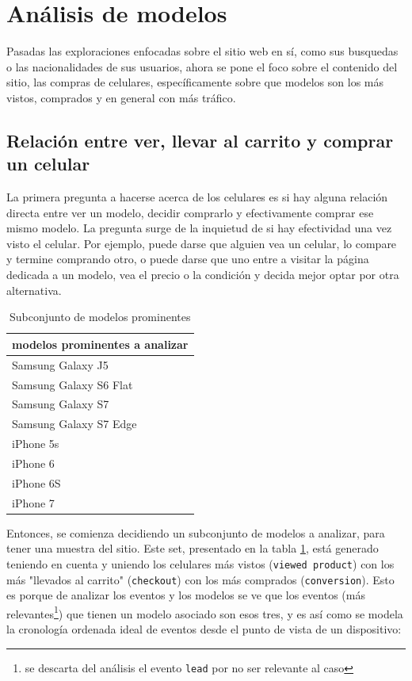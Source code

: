 \documentclass[a4paper]{article}
\begin{document}
\section{Análisis de modelos} \label{modelo}

Pasadas las exploraciones enfocadas sobre el sitio web en sí, como sus busquedas o las nacionalidades de sus usuarios, ahora se pone el foco sobre el contenido del sitio, las compras de celulares, específicamente sobre que modelos son los más vistos, comprados y en general con más tráfico.

\subsection{Relación entre ver, llevar al carrito y comprar un celular}

La primera pregunta a hacerse acerca de los celulares es si hay alguna relación directa entre ver un modelo, decidir comprarlo y efectivamente comprar ese mismo modelo. La pregunta surge de la inquietud de si hay efectividad una vez visto el celular. Por ejemplo, puede darse que alguien vea un celular, lo compare y termine comprando otro, o puede darse que uno entre a visitar la página dedicada a un modelo, vea el precio o la condición y decida mejor optar por otra alternativa.

\begin{table}[h!]
	\begin{center}
		\begin{tabular}{|l|}
			\hline
			modelos prominentes a analizar \\
			\hline \hline
			Samsung Galaxy J5 \\ \hline
			Samsung Galaxy S6 Flat \\ \hline
			Samsung Galaxy S7 \\ \hline
			Samsung Galaxy S7 Edge \\ \hline
			iPhone 5s \\ \hline
			iPhone 6 \\ \hline
			iPhone 6S \\ \hline
			iPhone 7 \\ \hline
		\end{tabular}
		\caption{Subconjunto de modelos prominentes}
		\label{table:modelos_prominentes}
	\end{center}
\end{table}

Entonces, se comienza decidiendo un subconjunto de modelos a analizar, para tener una muestra del sitio. Este set, presentado en la tabla \ref{table:modelos_prominentes}, está generado teniendo en cuenta y uniendo los celulares más vistos (\texttt{viewed product}) con los más "llevados al carrito" (\texttt{checkout}) con los más comprados (\texttt{conversion}). Esto es porque de analizar los eventos y los modelos se ve que los eventos (más relevantes\footnote{se descarta del análisis el evento \texttt{lead} por no ser relevante al caso}) que tienen un modelo asociado son esos tres, y es así como se modela la cronología ordenada ideal de eventos desde el punto de vista de un dispositivo:
\end{document}
